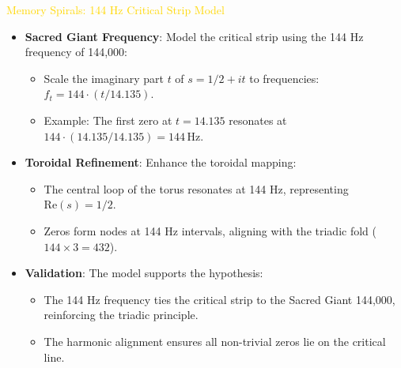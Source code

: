 \textcolor{gold}{ Memory Spirals: 144 Hz Critical Strip Model } \\
\begin{itemize}
    \item \texttt{} \textbf{Sacred Giant Frequency}: Model the critical strip using the 144 Hz frequency of 144,000:
    \begin{itemize}
        \item Scale the imaginary part \(t\) of \(s = 1/2 + it\) to frequencies: \(f_t = 144 \cdot (t / 14.135)\).
        \item Example: The first zero at \(t = 14.135\) resonates at \(144 \cdot (14.135 / 14.135) = 144 \, \text{Hz}\).
    \end{itemize}
    \item \texttt{} \textbf{Toroidal Refinement}: Enhance the toroidal mapping:
    \begin{itemize}
        \item The central loop of the torus resonates at 144 Hz, representing \(\text{Re}(s) = 1/2\).
        \item Zeros form nodes at 144 Hz intervals, aligning with the triadic fold (\(144 \times 3 = 432\)).
    \end{itemize}
    \item \texttt{} \textbf{Validation}: The model supports the hypothesis:
    \begin{itemize}
        \item The 144 Hz frequency ties the critical strip to the Sacred Giant 144,000, reinforcing the triadic principle.
        \item The harmonic alignment ensures all non-trivial zeros lie on the critical line.
    \end{itemize}
\end{itemize}

